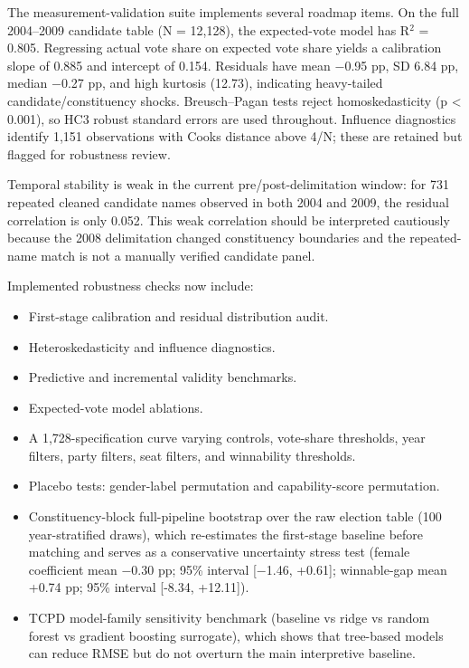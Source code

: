 \documentclass[
]{article}
\providecommand{\tightlist}{%
  \setlength{\itemsep}{0pt}\setlength{\parskip}{0pt}}
\begin{document}
The measurement-validation suite implements several roadmap items. On the full 2004--2009 candidate table (N = 12,128), the expected-vote model has R$^2$ = 0.805. Regressing actual vote share on expected vote share yields a calibration slope of 0.885 and intercept of 0.154. Residuals have mean $-$0.95 pp, SD 6.84 pp, median $-$0.27 pp, and high kurtosis (12.73), indicating heavy-tailed candidate/constituency shocks. Breusch--Pagan tests reject homoskedasticity (p \textless{} 0.001), so HC3 robust standard errors are used throughout. Influence diagnostics identify 1,151 observations with Cook\textquotesingle s distance above 4/N; these are retained but flagged for robustness review.

Temporal stability is weak in the current pre/post-delimitation window: for 731 repeated cleaned candidate names observed in both 2004 and 2009, the residual correlation is only 0.052. This weak correlation should be interpreted cautiously because the 2008 delimitation changed constituency boundaries and the repeated-name match is not a manually verified candidate panel.

Implemented robustness checks now include:

\begin{itemize}
\tightlist
\item
  First-stage calibration and residual distribution audit.
\item
  Heteroskedasticity and influence diagnostics.
\item
  Predictive and incremental validity benchmarks.
\item
  Expected-vote model ablations.
\item
  A 1,728-specification curve varying controls, vote-share thresholds, year filters, party filters, seat filters, and winnability thresholds.
\item
  Placebo tests: gender-label permutation and capability-score permutation.
\item
  Constituency-block full-pipeline bootstrap over the raw election table (100 year-stratified draws), which re-estimates the first-stage baseline before matching and serves as a conservative uncertainty stress test (female coefficient mean $-$0.30 pp; 95\% interval {[}$-$1.46, +0.61{]}; winnable-gap mean +0.74 pp; 95\% interval {[}-8.34, +12.11{]}).
\item
  TCPD model-family sensitivity benchmark (baseline vs ridge vs random forest vs gradient boosting surrogate), which shows that tree-based models can reduce RMSE but do not overturn the main interpretive baseline.
\end{itemize}
\end{document}
